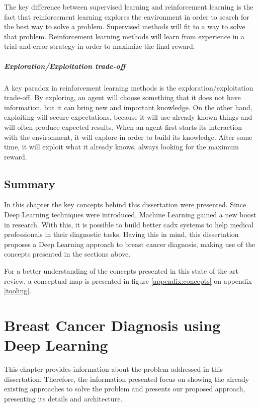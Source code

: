 \documentclass[
  twoside,
  11pt, a4paper,
  footinclude=true,
  headinclude=true,
  cleardoublepage=empty
]{scrbook}
\begin{document}
      The key difference between supervised learning and reinforcement learning is the fact that reinforcement learning explores the environment in order to search for the best way to solve a problem. Supervised methods will fit to a way to solve that problem. Reinforcement learning methods will learn from experience in a trial-and-error strategy in order to maximize the final reward.

      \paragraph{Exploration/Exploitation trade-off}
        A key paradox in reinforcement learning methods is the exploration/exploitation trade-off. By exploring, an agent will choose something that it does not have information, but it can bring new and important knowledge. On the other hand, exploiting will secure expectations, because it will use already known things and will often produce expected results. When an agent first starts its interaction with the environment, it will explore in order to build its knowledge. After some time, it will exploit what it already knows, always looking for the maximum reward. %

    \section{Summary} \label{background:summary}
      In this chapter the key concepts behind this dissertation were presented. Since Deep Learning techniques were introduced, Machine Learning gained a new boost in research. With this, it is possible to build better \gls{cadx} systems to help medical professionals in their diagnostic tasks. Having this in mind, this dissertation proposes a Deep Learning approach to breast cancer diagnosis, making use of the concepts presented in the sections above. %

      For a better understanding of the concepts presented in this state of the art review, a conceptual map is presented in figure \ref{appendix:concepts} on appendix \ref{tooling}.

  \chapter{Breast Cancer Diagnosis using Deep Learning}  \label{problem}
    This chapter provides information about the problem addressed in this dissertation. Therefore, the information presented focus on showing the already existing approaches to solve the problem and presents our proposed approach, presenting its details and architecture.
\end{document}
